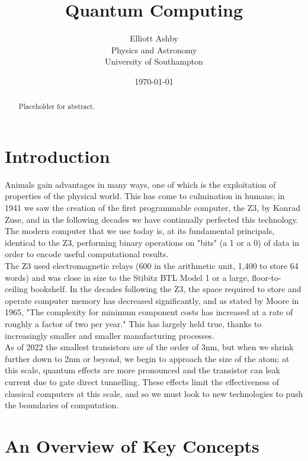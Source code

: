 \documentclass[reqno]{amsart}
\title{Quantum Computing}
\author[Elliott Ashby]{Elliott Ashby \\ Physics and Astronomy \\ University of Southampton}
\date{\monthyeardate\today}
\numberwithin{equation}{section}
\numberwithin{figure}{section}
\begin{document}
\begin{abstract}
    Placeholder for abstract.
\end{abstract}
\maketitle
\tableofcontents
\newpage
\section{Introduction}
\begin{justify}
Animals gain advantages in many ways, one of which is the exploitation of properties of the physical world. This has come to culmination in humans; in 1941 we saw the creation of the first programmable computer, the Z3, by Konrad Zuse, and in the following decades we have continually perfected this technology. The modern computer that we use today is, at its fundamental principals, identical to the Z3, performing binary operations on "bits" (a 1 or a 0) of data in order to encode useful computational results. \\

The Z3 used electromagnetic relays (600 in the arithmetic unit, 1,400 to store 64 words) and was close in size to the Stibitz BTL Model 1 or a large, floor-to-ceiling bookshelf. \cite{KonradZuseObituary} In the decades following the Z3, the space required to store and operate computer memory has decreased significantly, and as stated by Moore in 1965, "The complexity for minimum component costs has increased at a rate of roughly a factor of two per year." \cite{Moore1965} This has largely held true, thanks to increasingly smaller and smaller manufacturing processes. \\

As of 2022 the smallest transistors are of the order of 3nm, \cite{Samsung_2022} but when we shrink further down to 2nm or beyond, we begin to approach the size of the atom; at this scale, quantum effects are more pronounced and the transistor can leak current due to gate direct tunnelling. \cite{2nmGateOxide} These effects limit the effectiveness of classical computers at this scale, and so we must look to new technologies to push the boundaries of computation.
\end{justify}
\section{An Overview of Key Concepts}
\end{document}
